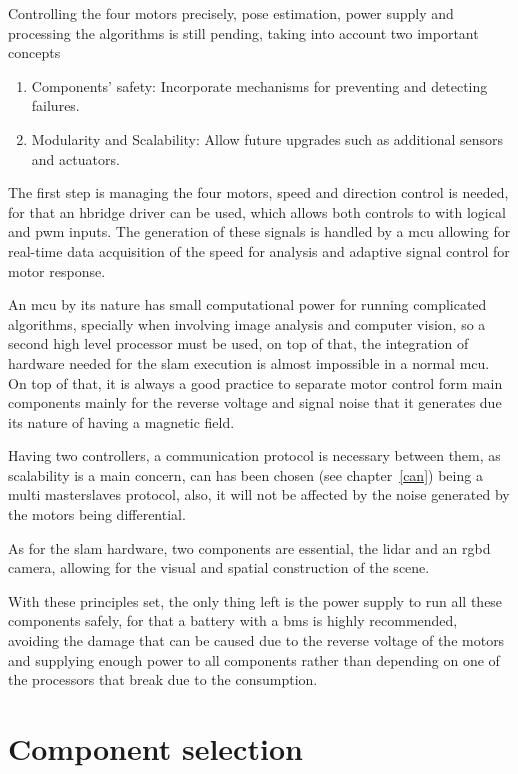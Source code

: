 Controlling the four motors precisely, pose estimation, power supply and processing the algorithms is still pending, taking into account two important concepts

\begin{enumerate}
  \item Components' safety:
        Incorporate mechanisms for preventing and detecting failures.
  \item Modularity and Scalability:
        Allow future upgrades such as additional sensors and actuators.
\end{enumerate}

The first step is managing the four motors, speed and direction control is needed, for that an \gls{hbridge} driver can be used, which allows both controls to with logical and \gls{pwm} inputs. The generation of these signals is handled by a \gls{mcu} allowing for real-time data acquisition of the speed for analysis and adaptive signal control for motor response.

An \gls{mcu} by its nature has small computational power for running complicated algorithms, specially when involving image analysis and computer vision, so a second high level processor must be used, on top of that, the integration of hardware needed for the \gls{slam} execution is almost impossible in a normal \gls{mcu}. On top of that, it is always a good practice to separate motor control form main components mainly for the reverse voltage and signal noise that it generates due its nature of having a magnetic field.

Having two controllers, a communication protocol is necessary between them, as scalability is a main concern, \gls{can} has been chosen (see chapter~\ref{can}) being a multi \glspl{masterslave} protocol, also, it will not be affected by the noise generated by the motors being differential.

As for the \gls{slam} hardware, two components are essential, the \gls{lidar} and an \gls{rgbd} camera, allowing for the visual and spatial construction of the scene.

With these principles set, the only thing left is the power supply to run all these components safely, for that a battery with a \gls{bms} is highly recommended, avoiding the damage that can be caused due to the reverse voltage of the motors and supplying enough power to all components rather than depending on one of the processors that break due to the consumption.

\chapter{Component selection}\label{chap:component_selection}

